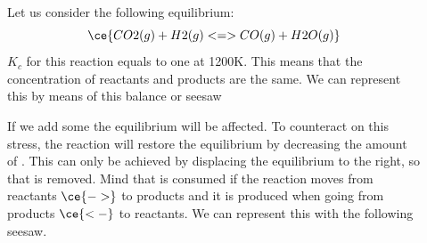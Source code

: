 \documentclass[main.tex]{subfiles}
\begin{document}
\begin{description}
 \item[] Let us consider the following equilibrium:
 \begin{equation*} \ce{CO2(g) + H2(g) <=> CO(g) + H2O(g)} \end{equation*}
$K_c$ for this reaction equals to one at 1200K. This means that the concentration of reactants and products are the same. We can represent this by means of this balance or seesaw
\begin{center}
\end{center}
If we add some  the equilibrium will be affected. To counteract on this stress, the reaction will restore the equilibrium by decreasing the amount of . This can only be achieved by displacing the equilibrium to the right, so that  is removed. Mind that  is consumed if the reaction moves from reactants $\ce{->}$ to products and it is produced when going from products $\ce{<-}$ to reactants. We can represent this with the following seesaw. 








\end{description}
\end{document}
